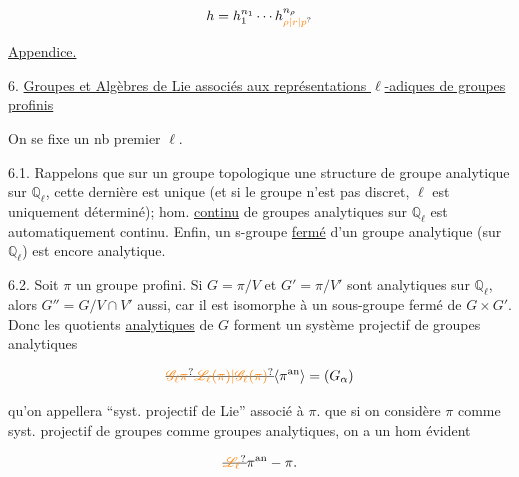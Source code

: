 \[
h=h_1^{n_1}\cdots h_{\unsure{\rho|r|p}}^{n_\rho}
\]

\uline{Appendice.}

6. \uline{Groupes et Algèbres de Lie  associés aux représentations $\ell$-adiques de groupes profinis}

On se fixe un nb premier $\ell$.

6.1. Rappelons que sur un groupe topologique  une structure de groupe analytique sur $\mathbb Q_\ell$, cette dernière est unique (et si le groupe n'est pas discret, $\ell$ est uniquement déterminé);    hom. \uline{continu} de groupes analytiques sur $\mathbb Q_\ell$ est automatiquement continu. Enfin, un s-groupe \uline{fermé} d'un groupe analytique (sur $\mathbb Q_\ell$) est encore analytique.

6.2. Soit  $\pi$ un groupe profini. Si $G=\pi/V$ et $G'=\pi/V'$ sont analytiques sur $\mathbb Q_\ell$, alors $G''=G/V\cap V'$ aussi, car il  est isomorphe à un sous-groupe fermé de $G\times G'$. Donc les  quotients \uline{analytiques} de $G$ forment un système projectif de groupes analytiques

\[
\deleted{\unsure{\mathscr G_\ell\pi}}\deleted{\unsure{\mathscr L_\ell(\pi)|\mathscr G_\ell(\pi)}}\inserted{\pi^{\mathrm{an}}}=(G_\alpha)
\]

qu'on appellera ``syst. projectif de Lie'' associé à $\pi$.  que si on considère $\pi$ comme   syst. projectif de groupes  comme groupes analytiques, on a un hom évident

\[
\deleted{\unsure{\mathscr L_\ell}}\pi^{\mathrm{an}}\mathbin{-}\pi.
\]

